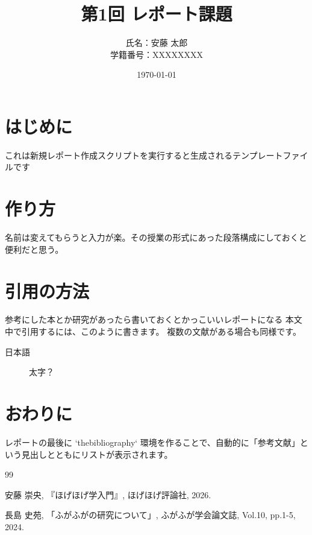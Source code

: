 \documentclass[a4paper,10pt]{ltjsarticle}
\title{第1回 レポート課題}
\author{氏名：安藤 太郎 \\ 学籍番号：XXXXXXXX}
\date{\today}
\begin{document}
\maketitle


\section{はじめに}
これは新規レポート作成スクリプトを実行すると生成されるテンプレートファイルです

\section{作り方}
名前は変えてもらうと入力が楽。その授業の形式にあった段落構成にしておくと便利だと思う。

\section{引用の方法}
参考にした本とか研究があったら書いておくとかっこいいレポートになる
本文中で引用するには、このように書きます\cite{book1}。
複数の文献がある場合も同様です\cite{paper1}。

\begin{description}
    \item[日本語] 太字？ 
\end{description}

\section{おわりに}
レポートの最後に `thebibliography` 環境を作ることで、自動的に「参考文献」という見出しとともにリストが表示されます。

\begin{thebibliography}{99}

    安藤 崇央, 『ほげほげ学入門』, ほげほげ評論社, 2026.

    長島 史苑, 「ふがふがの研究について」, ふがふが学会論文誌, Vol.10, pp.1-5, 2024.

\end{thebibliography}
\end{document}
